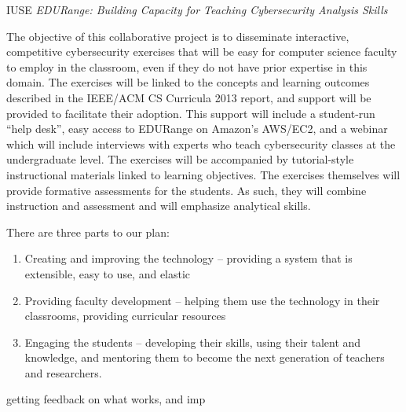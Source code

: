 \documentclass[11pt]{report}
\newenvironment{packenum}{
\begin{enumerate}
  \setlength{\itemsep}{1pt}
  \setlength{\parskip}{0pt}
  \setlength{\parsep}{0pt}
}{\end{enumerate}}
\begin{document}
\begin{center} 
{\Large IUSE {\em EDURange: Building Capacity for Teaching Cybersecurity Analysis Skills}}
\end{center}

The objective of this collaborative project is to disseminate interactive, competitive 
cybersecurity exercises that will be easy for computer science faculty to employ in the 
classroom, even if they do not have prior expertise in this domain.  The exercises 
will be linked to the concepts and learning outcomes described in the 
IEEE/ACM CS Curricula 2013 report, and support will be provided
to facilitate their adoption.  This support will include a student-run ``help desk'',
easy access to EDURange on Amazon's AWS/EC2, and a webinar which will include interviews
with experts who teach cybersecurity classes at the undergraduate level.  The exercises
will be accompanied by  tutorial-style instructional materials linked to learning
objectives.  The exercises themselves will provide formative assessments for the 
students.  As such, they will combine instruction and assessment and will emphasize
analytical skills.

There are three parts to our plan:
\begin{packenum}
\item Creating and improving the technology -- providing a system that is extensible, 
  easy to use, and   elastic
\item Providing faculty development --  helping them use the technology in their classrooms, 
  providing curricular resources
\item Engaging the students -- developing their skills, using their talent and knowledge, 
  and mentoring them to become the next generation of teachers and researchers.
\end{packenum}
  getting feedback on what works, and imp

\end{document}
